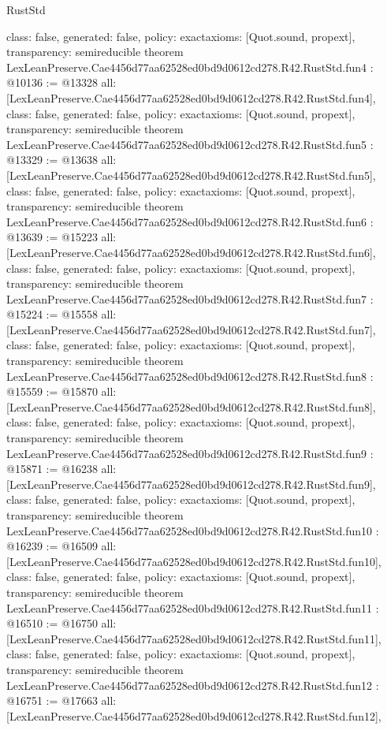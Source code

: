 \begin{lexlean}{RustStd}
\begin{coremodule}
{  class: false,
  generated: false,
  policy: exact{axioms: [Quot.sound, propext]},
  transparency: semireducible
}
theorem LexLeanPreserve.Cae4456d77aa62528ed0bd9d0612cd278.R42.RustStd.fun4 : @10136 := @13328 {
  all: [LexLeanPreserve.Cae4456d77aa62528ed0bd9d0612cd278.R42.RustStd.fun4],
  class: false,
  generated: false,
  policy: exact{axioms: [Quot.sound, propext]},
  transparency: semireducible
}
theorem LexLeanPreserve.Cae4456d77aa62528ed0bd9d0612cd278.R42.RustStd.fun5 : @13329 := @13638 {
  all: [LexLeanPreserve.Cae4456d77aa62528ed0bd9d0612cd278.R42.RustStd.fun5],
  class: false,
  generated: false,
  policy: exact{axioms: [Quot.sound, propext]},
  transparency: semireducible
}
theorem LexLeanPreserve.Cae4456d77aa62528ed0bd9d0612cd278.R42.RustStd.fun6 : @13639 := @15223 {
  all: [LexLeanPreserve.Cae4456d77aa62528ed0bd9d0612cd278.R42.RustStd.fun6],
  class: false,
  generated: false,
  policy: exact{axioms: [Quot.sound, propext]},
  transparency: semireducible
}
theorem LexLeanPreserve.Cae4456d77aa62528ed0bd9d0612cd278.R42.RustStd.fun7 : @15224 := @15558 {
  all: [LexLeanPreserve.Cae4456d77aa62528ed0bd9d0612cd278.R42.RustStd.fun7],
  class: false,
  generated: false,
  policy: exact{axioms: [Quot.sound, propext]},
  transparency: semireducible
}
theorem LexLeanPreserve.Cae4456d77aa62528ed0bd9d0612cd278.R42.RustStd.fun8 : @15559 := @15870 {
  all: [LexLeanPreserve.Cae4456d77aa62528ed0bd9d0612cd278.R42.RustStd.fun8],
  class: false,
  generated: false,
  policy: exact{axioms: [Quot.sound, propext]},
  transparency: semireducible
}
theorem LexLeanPreserve.Cae4456d77aa62528ed0bd9d0612cd278.R42.RustStd.fun9 : @15871 := @16238 {
  all: [LexLeanPreserve.Cae4456d77aa62528ed0bd9d0612cd278.R42.RustStd.fun9],
  class: false,
  generated: false,
  policy: exact{axioms: [Quot.sound, propext]},
  transparency: semireducible
}
theorem LexLeanPreserve.Cae4456d77aa62528ed0bd9d0612cd278.R42.RustStd.fun10 : @16239 := @16509 {
  all: [LexLeanPreserve.Cae4456d77aa62528ed0bd9d0612cd278.R42.RustStd.fun10],
  class: false,
  generated: false,
  policy: exact{axioms: [Quot.sound, propext]},
  transparency: semireducible
}
theorem LexLeanPreserve.Cae4456d77aa62528ed0bd9d0612cd278.R42.RustStd.fun11 : @16510 := @16750 {
  all: [LexLeanPreserve.Cae4456d77aa62528ed0bd9d0612cd278.R42.RustStd.fun11],
  class: false,
  generated: false,
  policy: exact{axioms: [Quot.sound, propext]},
  transparency: semireducible
}
theorem LexLeanPreserve.Cae4456d77aa62528ed0bd9d0612cd278.R42.RustStd.fun12 : @16751 := @17663 {
  all: [LexLeanPreserve.Cae4456d77aa62528ed0bd9d0612cd278.R42.RustStd.fun12],
}
\end{coremodule}
\end{lexlean}
